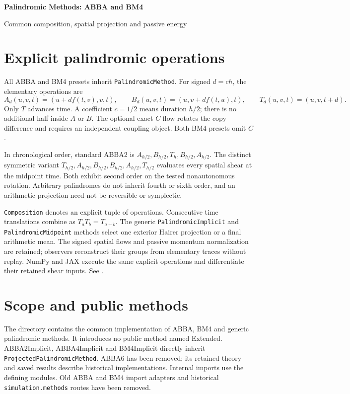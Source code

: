 \documentclass[11pt,a4paper]{article}
\begin{document}
\begin{center}
{\LARGE\bfseries\color{gcblue}Palindromic Methods: ABBA and BM4}\par
\vspace{0.35em}
{\large Common composition, spatial projection and passive energy}
\end{center}

\section*{Explicit palindromic operations}
All ABBA and BM4 presets inherit \texttt{PalindromicMethod}. For signed
$d=c h$, the elementary operations are
\[
 A_d(u,v,t)=(u+d f(t,v),v,t),\qquad
 B_d(u,v,t)=(u,v+d f(t,u),t),\qquad
 T_d(u,v,t)=(u,v,t+d).
\]
Only $T$ advances time. A coefficient $c=1/2$ means duration $h/2$;
there is no additional half inside $A$ or $B$. The optional exact $C$ flow
rotates the copy difference and requires an independent coupling object.
Both BM4 presets omit $C$.

In chronological order, standard ABBA2 is
$A_{h/2},B_{h/2},T_h,B_{h/2},A_{h/2}$.
The distinct symmetric variant
$T_{h/2},A_{h/2},B_{h/2},B_{h/2},A_{h/2},T_{h/2}$
evaluates every spatial shear at the midpoint time. Both exhibit second
order on the tested nonautonomous rotation. Arbitrary palindromes do not
inherit fourth or sixth order, and an arithmetic projection need not be
reversible or symplectic.

\texttt{Composition} denotes an explicit tuple of operations.
Consecutive time translations combine as $T_a T_b=T_{a+b}$.
The generic \texttt{PalindromicImplicit} and \texttt{PalindromicMidpoint}
methods select one exterior Hairer projection or a final arithmetic mean.
The signed spatial flows and passive momentum normalization are retained;
observers reconstruct their groups from elementary traces without replay. NumPy and JAX execute the same
explicit operations and differentiate their retained shear inputs.
See .


\section{Scope and public methods}
The directory  contains the common
implementation of ABBA, BM4 and generic palindromic methods. It introduces no public
method named Extended. ABBA2Implicit, ABBA4Implicit and BM4Implicit directly
inherit \texttt{ProjectedPalindromicMethod}. ABBA6 has been removed; its
retained theory and saved results describe historical implementations.
Internal imports use the defining modules. Old ABBA and BM4 import adapters
and historical \texttt{simulation.methods} routes have been removed.
\end{document}
